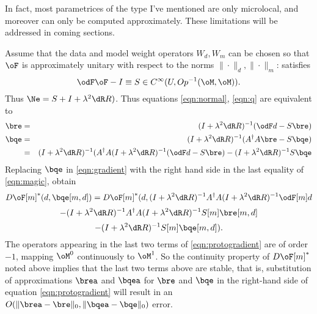 In fact, most parametrices of the type I've mentioned are only
microlocal, and moreover can only be computed approximately. These
limitations will be addressed in coming sections.

Assume that the data and model weight operators $W_d, W_m$ can be
chosen so that $\oF$ is approximately unitary with respect to the
norms $\|\cdot\|_d, \|\cdot\|_m$:
satisfies 
\begin{equation}
\label{eqn:parametrix}
\odF\oF - I \equiv S \in C^{\infty}( U, Op^{-1}(\oM,\oM)). 
\end{equation}
Thus $\Ne = S +
I +\lambda^2\dR R)$. Thus equations \ref{eqn:normal}, \ref{eqn:q} are equivalent to 
\begin{eqnarray}
\label{eqn:magic}
\bre &=& (I+\lambda^2\dR R)^{-1}(\odF d - S\bre)\\
\bqe &=&(I+\lambda^2\dR R)^{-1}(A^{\dagger}A\bre - S\bqe)\\
   & = &(I+\lambda^2\dR R)^{-1}(A^{\dagger}A (I+\lambda^2 \dR R)^{-1}(\odF d -
             S \bre)-(I+\lambda^2\dR R)^{-1}S\bqe
\end{eqnarray}
Replacing $\bqe$ in \ref{eqn:gradient} with the right hand side in the last equality of
\ref{eqn:magic}, obtain
\[
D\oF[m]^*(d,\bqe[m,d])=
D\oF[m]^*(d,(I+\lambda^2\dR R)^{-1}A^{\dagger}A (I+\lambda^2 \dR R)^{-1}\odF[m]d 
\]
\[
- (I+\lambda^2\dR R)^{-1}A^{\dagger}A (I+\lambda^2 \dR R)^{-1}
S[m]\bre[m,d] 
\]
\begin{equation}
\label{eqn:protogradient}
- (I+\lambda^2\dR R)^{-1}S[m]\bqe[m,d]).
\end{equation}
The operators appearing in the last two terms of
\ref{eqn:protogradient} are of
order $-1$, mapping $\oM^0$ continuously to $\oM^1$. So the continuity
property of $D\oF[m]^*$ noted above implies that the last two terms
above are stable, that is, substitution of approximations $\brea$ and
$\bqea$ for $\bre$ and $\bqe$ in the right-hand side of equation
\ref{eqn:protogradient} will result in an
$O(\|\brea-\bre\|_0,\|\bqea-\bqe\|_0)$ error.

